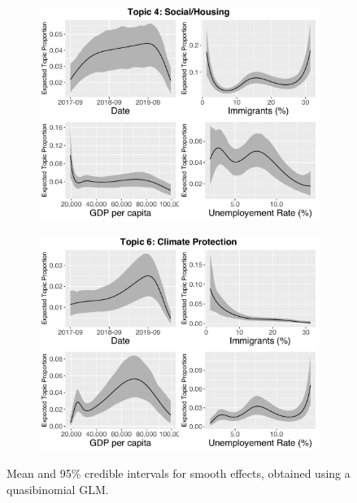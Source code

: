 \begin{figure}[h!]
  \centering
  \captionsetup{justification=centering,margin=2cm}
  \begin{subfigure}[b]{0.49\linewidth}
    \includegraphics[width=\linewidth]{../plots/5_1/quasi_t4_cont.pdf}
  \end{subfigure}
  \begin{subfigure}[b]{0.49\linewidth}
    \includegraphics[width=\linewidth]{../plots/5_1/quasi_t6_cont.pdf}
  \end{subfigure}
  \caption{Mean and 95\% credible intervals for smooth effects, obtained using a quasibinomial GLM.}
  \label{fig:quasi_t46_cont}
\end{figure}

